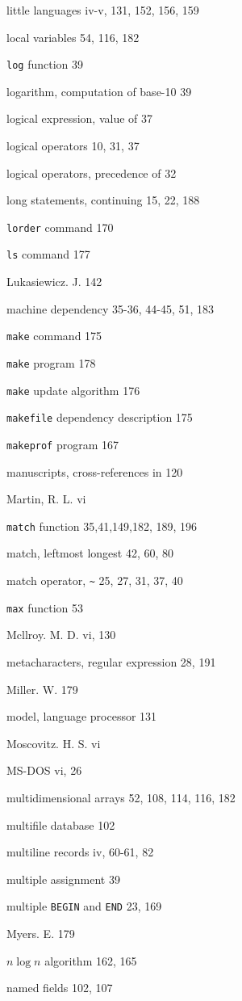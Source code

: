 \begin{multicols}{2}
little languages iv-v, 131, 152, 156, 159

local variables 54, 116, 182

\verb'log' function 39

logarithm, computation of base-10 39

logical expression, value of 37

logical operators 10, 31, 37

logical operators, precedence of 32

long statements, continuing 15, 22, 188

\verb'lorder' command 170

\verb'ls' command 177

Lukasiewicz. J. 142

machine dependency 35-36, 44-45, 51, 183

\verb'make' command 175

\verb'make' program 178

\verb'make' update algorithm 176

\verb'makefile' dependency description 175

\verb'makeprof' program 167

manuscripts, cross-references in 120

Martin, R. L. vi

\verb'match' function 35,41,149,182, 189, 196

match, leftmost longest 42, 60, 80

match operator, \verb'~' 25, 27, 31, 37, 40

\verb'max' function 53

Mcllroy. M. D. vi, 130

metacharacters, regular expression 28, 191

Miller. W. 179

model, language processor 131

Moscovitz. H. S. vi

MS-DOS vi, 26

multidimensional arrays 52, 108, 114, 116, 182

multifile database 102

multiline records iv, 60-61, 82

multiple assignment 39

multiple \verb'BEGIN' and \verb'END' 23, 169

Myers. E. 179

$n \log n$ algorithm 162, 165

named fields 102, 107


\end{multicols}

